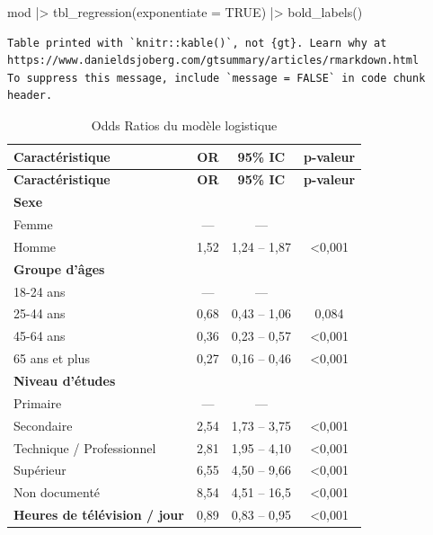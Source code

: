 \documentclass[
  letterpaper,
  DIV=11,
  numbers=noendperiod,
  oneside]{scrreprt}
\newenvironment{Shaded}{\begin{snugshade}}{\end{snugshade}}
\newcommand{\AttributeTok}[1]{\textcolor[rgb]{0.40,0.45,0.13}{#1}}
\newcommand{\ConstantTok}[1]{\textcolor[rgb]{0.56,0.35,0.01}{#1}}
\newcommand{\FunctionTok}[1]{\textcolor[rgb]{0.28,0.35,0.67}{#1}}
\newcommand{\NormalTok}[1]{\textcolor[rgb]{0.00,0.23,0.31}{#1}}
\newcommand{\SpecialCharTok}[1]{\textcolor[rgb]{0.37,0.37,0.37}{#1}}
\begin{document}
\begin{Shaded}
\begin{Highlighting}[]
\NormalTok{mod }\SpecialCharTok{|\textgreater{}} 
  \FunctionTok{tbl\_regression}\NormalTok{(}\AttributeTok{exponentiate =} \ConstantTok{TRUE}\NormalTok{) }\SpecialCharTok{|\textgreater{}} 
  \FunctionTok{bold\_labels}\NormalTok{()}
\end{Highlighting}
\end{Shaded}

\begin{verbatim}
Table printed with `knitr::kable()`, not {gt}. Learn why at
https://www.danieldsjoberg.com/gtsummary/articles/rmarkdown.html
To suppress this message, include `message = FALSE` in code chunk header.
\end{verbatim}

\hypertarget{tbl-rappel-model}{}
\begin{longtable}[]{@{}lccc@{}}
\caption{\label{tbl-rappel-model}Odds Ratios du modèle
logistique}\tabularnewline
\toprule()
\textbf{Caractéristique} & \textbf{OR} & \textbf{95\% IC} &
\textbf{p-valeur} \\
\midrule()
\endfirsthead
\toprule()
\textbf{Caractéristique} & \textbf{OR} & \textbf{95\% IC} &
\textbf{p-valeur} \\
\midrule()
\endhead
\textbf{Sexe} & & & \\
Femme & --- & --- & \\
Homme & 1,52 & 1,24 -- 1,87 & \textless0,001 \\
\textbf{Groupe d'âges} & & & \\
18-24 ans & --- & --- & \\
25-44 ans & 0,68 & 0,43 -- 1,06 & 0,084 \\
45-64 ans & 0,36 & 0,23 -- 0,57 & \textless0,001 \\
65 ans et plus & 0,27 & 0,16 -- 0,46 & \textless0,001 \\
\textbf{Niveau d'études} & & & \\
Primaire & --- & --- & \\
Secondaire & 2,54 & 1,73 -- 3,75 & \textless0,001 \\
Technique / Professionnel & 2,81 & 1,95 -- 4,10 & \textless0,001 \\
Supérieur & 6,55 & 4,50 -- 9,66 & \textless0,001 \\
Non documenté & 8,54 & 4,51 -- 16,5 & \textless0,001 \\
\textbf{Heures de télévision / jour} & 0,89 & 0,83 -- 0,95 &
\textless0,001 \\
\bottomrule()
\end{longtable}
\end{document}
